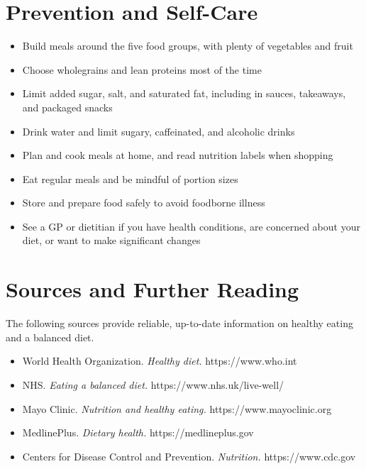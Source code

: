 \section*{Prevention and Self-Care}
\begin{itemize}
    \item Build meals around the five food groups, with plenty of vegetables and fruit
    \item Choose wholegrains and lean proteins most of the time
    \item Limit added sugar, salt, and saturated fat, including in sauces, takeaways, and packaged snacks
    \item Drink water and limit sugary, caffeinated, and alcoholic drinks
    \item Plan and cook meals at home, and read nutrition labels when shopping
    \item Eat regular meals and be mindful of portion sizes
    \item Store and prepare food safely to avoid foodborne illness
    \item See a GP or dietitian if you have health conditions, are concerned about your diet, or want to make significant changes
\end{itemize}

\section*{Sources and Further Reading}
The following sources provide reliable, up-to-date information on healthy eating and a balanced diet.
\begin{itemize}
    \item World Health Organization. \textit{Healthy diet.} https://www.who.int
    \item NHS. \textit{Eating a balanced diet.} https://www.nhs.uk/live-well/
    \item Mayo Clinic. \textit{Nutrition and healthy eating.} https://www.mayoclinic.org
    \item MedlinePlus. \textit{Dietary health.} https://medlineplus.gov
    \item Centers for Disease Control and Prevention. \textit{Nutrition.} https://www.cdc.gov
\end{itemize}
